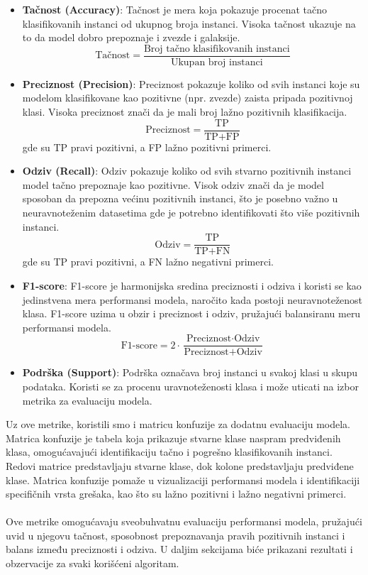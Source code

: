 \documentclass[a4paper,12pt]{article}
\begin{document}
\begin{itemize}
    \item \textbf{Tačnost (Accuracy)}: Tačnost je mera koja pokazuje procenat tačno klasifikovanih instanci od ukupnog broja instanci. Visoka tačnost ukazuje na to da model dobro prepoznaje i zvezde i galaksije.
    \[
    \text{Tačnost} = \frac{\text{Broj tačno klasifikovanih instanci}}{\text{Ukupan broj instanci}}
    \]
    
    \item \textbf{Preciznost (Precision)}: Preciznost pokazuje koliko od svih instanci koje su modelom klasifikovane kao pozitivne (npr. zvezde) zaista pripada pozitivnoj klasi. Visoka preciznost znači da je mali broj lažno pozitivnih klasifikacija.
    \[
    \text{Preciznost} = \frac{\text{TP}}{\text{TP} + \text{FP}}
    \]
    gde su TP pravi pozitivni, a FP lažno pozitivni primerci.

    \item \textbf{Odziv (Recall)}: Odziv pokazuje koliko od svih stvarno pozitivnih instanci model tačno prepoznaje kao pozitivne. Visok odziv znači da je model sposoban da prepozna većinu pozitivnih instanci, što je posebno važno u neuravnoteženim datasetima gde je potrebno identifikovati što više pozitivnih instanci.
    \[
    \text{Odziv} = \frac{\text{TP}}{\text{TP} + \text{FN}}
    \]
    gde su TP pravi pozitivni, a FN lažno negativni primerci.

    \item \textbf{F1-score}: F1-score je harmonijska sredina preciznosti i odziva i koristi se kao jedinstvena mera performansi modela, naročito kada postoji neuravnoteženost klasa. F1-score uzima u obzir i preciznost i odziv, pružajući balansiranu meru performansi modela.
    \[
    \text{F1-score} = 2 \cdot \frac{\text{Preciznost} \cdot \text{Odziv}}{\text{Preciznost} + \text{Odziv}}
    \]

    \item \textbf{Podrška (Support)}: Podrška označava broj instanci u svakoj klasi u skupu podataka. Koristi se za procenu uravnoteženosti klasa i može uticati na izbor metrika za evaluaciju modela.
\end{itemize}

Uz ove metrike, koristili smo i matricu konfuzije za dodatnu evaluaciju modela. Matrica konfuzije je tabela koja prikazuje stvarne klase naspram predviđenih klasa, omogućavajući identifikaciju tačno i pogrešno klasifikovanih instanci. Redovi matrice predstavljaju stvarne klase, dok kolone predstavljaju predviđene klase. Matrica konfuzije pomaže u vizualizaciji performansi modela i identifikaciji specifičnih vrsta grešaka, kao što su lažno pozitivni i lažno negativni primerci.\\\\
Ove metrike omogućavaju sveobuhvatnu evaluaciju performansi modela, pružajući uvid u njegovu tačnost, sposobnost prepoznavanja pravih pozitivnih instanci i balans između preciznosti i odziva. U daljim sekcijama biće prikazani rezultati i obzervacije za svaki korišćeni algoritam.
\end{document}
